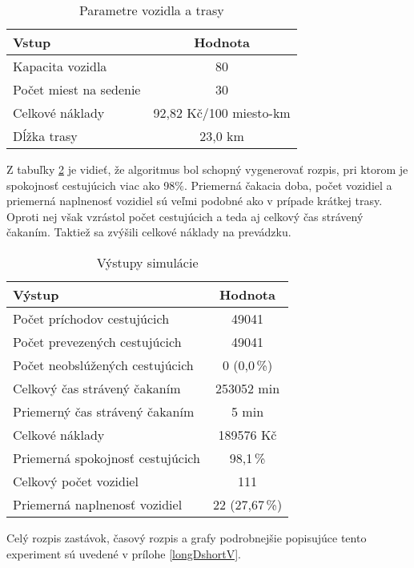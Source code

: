 \begin{table}[h]
  \centering
  \begin{tabular}{|l|c|}
    \hline
    \textbf{Vstup} & \textbf{Hodnota} \\ \hline
    Kapacita vozidla & 80 \\ \hline
    Počet miest na sedenie & 30 \\ \hline
    Celkové náklady & 92,82 Kč/100 miesto-km \\ \hline
    Dĺžka trasy & 23,0 km \\ \hline
  \end{tabular}
  \caption{Parametre vozidla a trasy}
  \label{tab:longDshortVin}
\end{table}

Z tabuľky \ref{tab:longDshortVout} je vidieť, že algoritmus bol schopný vygenerovať rozpis, pri ktorom je spokojnosť cestujúcich viac ako 98\%.
Priemerná čakacia doba, počet vozidiel a priemerná naplnenosť vozidiel sú veľmi podobné ako v prípade krátkej trasy.
Oproti nej však vzrástol počet cestujúcich a teda aj celkový čas strávený čakaním.
Taktiež sa zvýšili celkové náklady na prevádzku.

\begin{table}[h]
  \centering
  \begin{tabular}{|l|c|}
    \hline
      \textbf{Výstup} & \textbf{Hodnota} \\ \hline
        Počet príchodov cestujúcich & 49041 \\ \hline
        Počet prevezených cestujúcich & 49041 \\ \hline
        Počet neobslúžených cestujúcich & 0 (0,0\,\%) \\ \hline
        Celkový čas strávený čakaním & 253052 min \\ \hline
        Priemerný čas strávený čakaním & 5 min \\ \hline
        Celkové náklady & 189576 Kč \\ \hline
        Priemerná spokojnosť cestujúcich & 98,1\,\% \\ \hline
        Celkový počet vozidiel & 111 \\ \hline
        Priemerná naplnenosť vozidiel & 22 (27,67\,\%) \\ \hline
  \end{tabular}
  \caption{Výstupy simulácie}
  \label{tab:longDshortVout}
\end{table}

Celý rozpis zastávok, časový rozpis a grafy podrobnejšie popisujúce tento experiment sú uvedené v prílohe \ref{longDshortV}.

